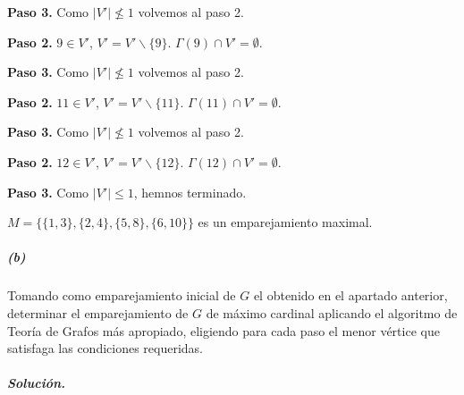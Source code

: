 \documentclass[12pt, oneside, a4paper]{article}
\begin{document}
{\bf Paso 3.} Como $|V'|\not\leq 1$
volvemos al paso 2.

{\bf Paso 2.} $9\in V'$, $V'=V'\backslash
\{9\}$. $\Gamma(9)\cap
V'=\emptyset$.

{\bf Paso 3.} Como $|V'|\not\leq 1$
volvemos al paso 2.

{\bf Paso 2.} $11\in V'$, $V'=V'\backslash
\{11\}$. $\Gamma(11)\cap
V'=\emptyset$.

{\bf Paso 3.} Como $|V'|\not\leq 1$
volvemos al paso 2.

{\bf Paso 2.} $12\in V'$, $V'=V'\backslash
\{12\}$. $\Gamma(12)\cap
V'=\emptyset$.

{\bf Paso 3.} Como $|V'|\leq 1$,
hemnos terminado.

$M=\{\{1,3\},\{2,4\},\{5,8\},\{6,10\}\}$
es un emparejamiento maximal.

\subparagraph{(b)} Tomando como emparejamiento inicial de $G$ el obtenido en el
apartado anterior, determinar el emparejamiento de $G$ de máximo
cardinal aplicando el algoritmo de Teoría de Grafos más apropiado,
eligiendo para cada paso el menor vértice que satisfaga las
condiciones requeridas.

\subparagraph{Solución.\\}
\end{document}
